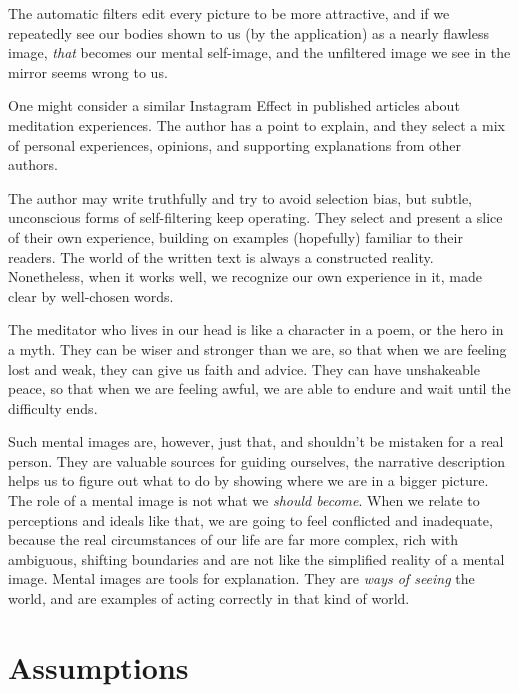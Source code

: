 The automatic filters edit every picture to be more attractive, and if
we repeatedly see our bodies shown to us (by the application) as a
nearly flawless image, \emph{that} becomes our mental self-image, and
the unfiltered image we see in the mirror seems wrong to us.

One might consider a similar Instagram Effect in published articles
about meditation experiences. The author has a point to explain, and
they select a mix of personal experiences, opinions, and supporting
explanations from other authors.

The author may write truthfully and try to avoid selection bias, but
subtle, unconscious forms of self-filtering keep operating. They select
and present a slice of their own experience, building on examples
(hopefully) familiar to their readers. The world of the written text is
always a constructed reality. Nonetheless, when it works well, we
recognize our own experience in it, made clear by well-chosen words.

\clearpage


The meditator who lives in our head is like a character in a poem, or
the hero in a myth. They can be wiser and stronger than we are, so that
when we are feeling lost and weak, they can give us faith and advice.
They can have unshakeable peace, so that when we are feeling awful, we
are able to endure and wait until the difficulty ends.

Such mental images are, however, just that, and shouldn't be mistaken
for a real person. They are valuable sources for guiding ourselves, the
narrative description helps us to figure out what to do by showing where
we are in a bigger picture. The role of a mental image is not what we
\emph{should become}. When we relate to perceptions and ideals like
that, we are going to feel conflicted and inadequate, because the real
circumstances of our life are far more complex, rich with ambiguous,
shifting boundaries and are not like the simplified reality of a mental
image. Mental images are tools for explanation. They are \emph{ways of
seeing} the world, and are examples of acting correctly in that kind of
world.

\clearpage

\section{Assumptions}


